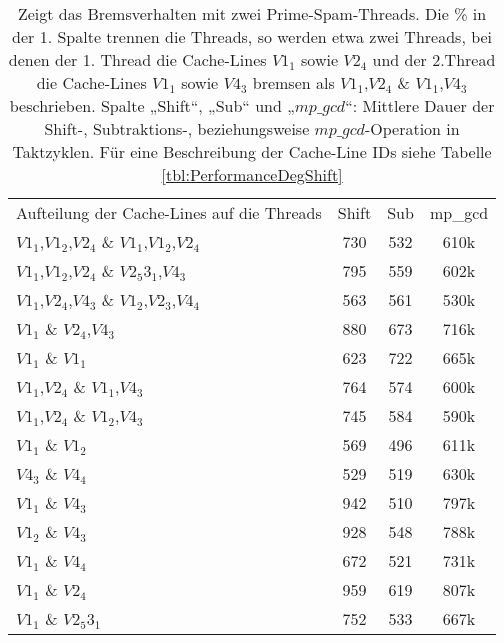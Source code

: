 \begin{table}[h]
\caption{Zeigt das Bremsverhalten mit zwei Prime-Spam-Threads. Die \% in der 1. Spalte trennen die Threads, so werden etwa zwei Threads, bei denen der 1. Thread die Cache-Lines $V1_1$ sowie $V2_4$ und der 2.Thread die Cache-Lines $V1_1$ sowie $V4_3$ bremsen als $V1_1$,$V2_4$ \& $V1_1$,$V4_3$ beschrieben. Spalte „Shift“, „Sub“ und „$mp\_gcd$“: Mittlere Dauer der Shift-, Subtraktions-, beziehungsweise $mp\_gcd$-Operation in Taktzyklen. Für eine Beschreibung der Cache-Line IDs siehe Tabelle \ref{tbl:PerformanceDegShift}}
\label{tbl:PerformanceDegShiftMultithreadTwo}
\begin{tabular}{lccc}
Aufteilung der Cache-Lines auf die Threads & Shift & Sub & mp\_gcd \\
$V1_1$,$V1_2$,$V2_4$ \& $V1_1$,$V1_2$,$V2_4$                       & 730   & 532 & 610k    \\
$V1_1$,$V1_2$,$V2_4$ \& $V2_5 3_1$,$V4_3$                         & 795   & 559 & 602k    \\
$V1_1$,$V2_4$,$V4_3$ \& $V1_2$,$V2_3$,$V4_4$                     & 563   & 561 & 530k    \\
$V1_1$ \& $V2_4$,$V4_3$                               & 880   & 673 & 716k    \\
$V1_1$ \& $V1_1$                                   & 623   & 722 & 665k    \\
$V1_1$,$V2_4$ \& $V1_1$,$V4_3$                            & 764   & 574 & 600k    \\
$V1_1$,$V2_4$ \& $V1_2$,$V4_3$                            & 745   & 584 & 590k    \\
$V1_1$ \& $V1_2$                                   & 569   & 496 & 611k    \\
$V4_3$ \& $V4_4$                                 & 529   & 519 & 630k    \\
$V1_1$ \& $V4_3$                                  & 942   & 510 & 797k    \\
$V1_2$ \& $V4_3$                                  & 928   & 548 & 788k    \\
$V1_1$ \& $V4_4$                                  & 672   & 521 & 731k    \\
$V1_1$ \& $V2_4$                                   & 959   & 619 & 807k    \\
$V1_1$ \& $V2_5 3_1$                                   & 752   & 533 & 667k    \\
\end{tabular}
\end{table}

